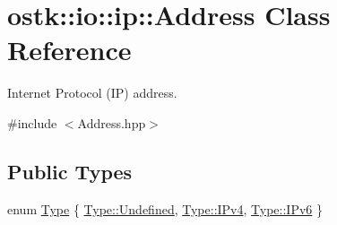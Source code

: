 \hypertarget{classostk_1_1io_1_1ip_1_1_address}{}\section{ostk\+:\+:io\+:\+:ip\+:\+:Address Class Reference}
\label{classostk_1_1io_1_1ip_1_1_address}


Internet Protocol (IP) address.  




{\ttfamily \#include $<$Address.\+hpp$>$}

\subsection*{Public Types}
\begin{DoxyCompactItemize}
\item 
enum \hyperlink{classostk_1_1io_1_1ip_1_1_address_a03b78ae8f7ddbb893d7396e6a1baf695}{Type} \{ \hyperlink{classostk_1_1io_1_1ip_1_1_address_a03b78ae8f7ddbb893d7396e6a1baf695aec0fc0100c4fc1ce4eea230c3dc10360}{Type\+::\+Undefined}, 
\hyperlink{classostk_1_1io_1_1ip_1_1_address_a03b78ae8f7ddbb893d7396e6a1baf695a42a9137a05a60eb752dcdf982e717626}{Type\+::\+I\+Pv4}, 
\hyperlink{classostk_1_1io_1_1ip_1_1_address_a03b78ae8f7ddbb893d7396e6a1baf695afdb7cb8f657426e7c409bfd6d1a36ce4}{Type\+::\+I\+Pv6}
 \}
\end{DoxyCompactItemize}
